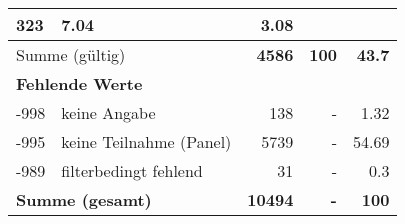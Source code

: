 \begin{longtable}{lXrrr}
       \num{323} &
       \num[round-mode=places,round-precision=2]{7.04} &
         \num[round-mode=places,round-precision=2]{3.08} \\
     \midrule
     \multicolumn{2}{l}{Summe (gültig)} &
       \textbf{\num{4586}} &
     \textbf{\num{100}} &
       \textbf{\num[round-mode=places,round-precision=2]{43.7}} \\
     \multicolumn{5}{l}{\textbf{Fehlende Werte}}\\
       -998 &
       keine Angabe &
         \num{138} &
        - &
         \num[round-mode=places,round-precision=2]{1.32} \\
       -995 &
       keine Teilnahme (Panel) &
         \num{5739} &
        - &
         \num[round-mode=places,round-precision=2]{54.69} \\
       -989 &
       filterbedingt fehlend &
         \num{31} &
        - &
         \num[round-mode=places,round-precision=2]{0.3} \\
     \midrule
     \multicolumn{2}{l}{\textbf{Summe (gesamt)}} &
          \textbf{\num{10494}} &
        \textbf{-} &
        \textbf{\num{100}} \\
     \bottomrule
     \end{longtable}
     
